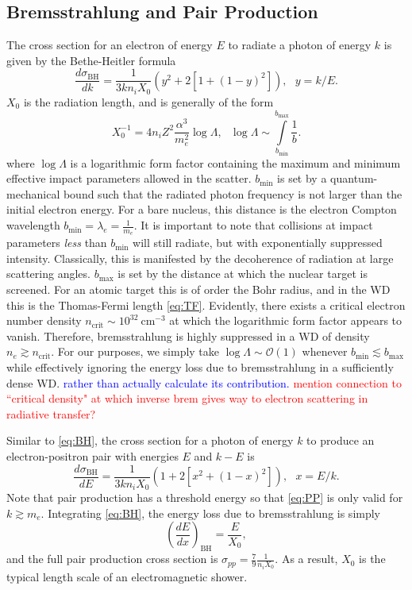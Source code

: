 \documentclass[twocolumn,showpacs,preprintnumbers,amsmath,amssymb,prd]{revtex4}
\newcommand{\OO}{\mathcal{O}}
\def\r{\right)}
\def\l{\left(}
\begin{document}
\begin{appendices}
\subsection*{Bremsstrahlung and Pair Production}
The cross section for an electron of energy $E$ to radiate a photon of energy $k$ is given by the Bethe-Heitler formula
\begin{equation}
\label{eq:BH}
\frac{d \sigma_\text{BH}}{dk} = \frac{1}{3 k n_i X_0} (y^2+2 [1+ (1-y)^2]), ~~~ y = k/E.
\end{equation}
$X_0$ is the radiation length, and is generally of the form
\begin{equation}
X_0^{-1} = 4 n_i Z^2 \frac{\alpha^3}{m_e^2} \log{\Lambda}, ~~~ \log{\Lambda} \sim \int \limits_{b_\text{min}}^{b_\text{max}} \frac{1}{b}.
\end{equation}
where $\log{\Lambda}$ is a logarithmic form factor containing the maximum and minimum effective impact parameters allowed in the scatter. $b_\text{min}$ is set by a quantum-mechanical bound such that the radiated photon frequency is not larger than the initial electron energy. For a bare nucleus, this distance is the electron Compton wavelength $b_\text{min} = \lambda_e = \frac{1}{m_e}$. It is important to note that collisions at impact parameters \emph{less} than $b_\text{min}$ will still radiate, but with exponentially suppressed intensity. Classically, this is manifested by the decoherence of radiation at large scattering angles. $b_\text{max}$ is set by the distance at which the nuclear target is screened. For an atomic target this is of order the Bohr radius, and in the WD this is the Thomas-Fermi length \eqref{eq:TF}. Evidently, there exists a critical electron number density $n_\text{crit} \sim 10^{32} ~\text{cm}^{-3}$ at which the logarithmic form factor appears to vanish. Therefore, bremsstrahlung is highly suppressed in a WD of density $n_e \gtrsim n_\text{crit}$. For our purposes, we simply take $\log{\Lambda} \sim \OO(1)$ whenever $b_\text{min} \lesssim b_\text{max}$ while effectively ignoring the energy loss due to bremsstrahlung in a sufficiently dense WD. \textcolor{blue}{rather than actually calculate its contribution.} \textcolor{red}{mention connection to ``critical density" at which inverse brem gives way to electron scattering in radiative transfer?}

Similar to \eqref{eq:BH}, the cross section for a photon of energy $k$ to produce an electron-positron pair with energies $E$ and $k-E$ is
\begin{equation}
\label{eq:PP}
\frac{d \sigma_\text{BH}}{dE} = \frac{1}{3 k n_i X_0} (1+ 2[x^2+ (1-x)^2]), ~~~ x = E/k.
\end{equation}
Note that pair production has a threshold energy so that \eqref{eq:PP} is only valid for $k \gtrsim m_e$. Integrating \eqref{eq:BH}, the energy loss due to bremsstrahlung is simply
\begin{equation}
\l \frac{dE}{dx}\r_\text{BH} = \frac{E}{X_0},
\end{equation}
and the full pair production cross section is $\sigma_{pp} = \frac{7}{9} \frac{1}{n_i X_0}$. As a result, $X_0$ is the typical length scale of an electromagnetic shower.


\end{appendices}
\end{document}
